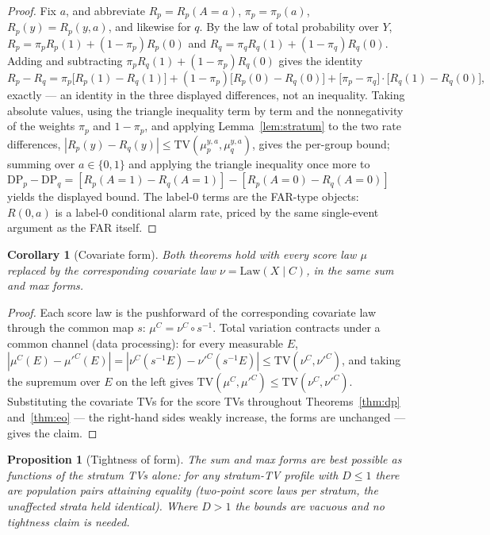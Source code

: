 \documentclass[11pt]{article}
\newtheorem{proposition}{Proposition}
\newtheorem{corollary}{Corollary}
\begin{document}
\begin{proof}
Fix $a$, and abbreviate $R_p = R_p(A{=}a)$, $\pi_p = \pi_p(a)$,
$R_p(y) = R_p(y,a)$, and likewise for $q$. By the law of total
probability over $Y$, $R_p = \pi_p R_p(1) + (1-\pi_p) R_p(0)$ and
$R_q = \pi_q R_q(1) + (1-\pi_q) R_q(0)$. Adding and subtracting
$\pi_p R_q(1) + (1-\pi_p) R_q(0)$ gives the identity
\[
R_p - R_q = \pi_p \bigl[R_p(1) - R_q(1)\bigr]
+ (1-\pi_p) \bigl[R_p(0) - R_q(0)\bigr]
+ \bigl[\pi_p - \pi_q\bigr] \cdot \bigl[R_q(1) - R_q(0)\bigr],
\]
exactly --- an identity in the three displayed differences, not an
inequality. Taking absolute values, using the triangle inequality
term by term and the nonnegativity of the weights $\pi_p$ and
$1-\pi_p$, and applying Lemma~\ref{lem:stratum} to the two rate
differences, $|R_p(y) - R_q(y)| \le
\mathrm{TV}(\mu_p^{y,a}, \mu_q^{y,a})$, gives the per-group bound;
summing over $a \in \{0,1\}$ and applying the triangle inequality
once more to $\mathrm{DP}_p - \mathrm{DP}_q = [R_p(A{=}1) -
R_q(A{=}1)] - [R_p(A{=}0) - R_q(A{=}0)]$ yields the displayed bound.
The label-0 terms are the FAR-type objects: $R(0,a)$ is a label-0
conditional alarm rate, priced by the same single-event argument
as the FAR itself.
\end{proof}

\begin{corollary}[Covariate form]
Both theorems hold with every score law $\mu$ replaced by the corresponding covariate law $\nu = \mathrm{Law}(X \mid C)$, in the same sum and max forms.
\end{corollary}

\begin{proof}
Each score law is the pushforward of the corresponding covariate
law through the common map $s$: $\mu^C = \nu^C \circ s^{-1}$.
Total variation contracts under a common channel (data
processing): for every measurable $E$,
$|\mu^C(E) - \mu'^C(E)| = |\nu^C(s^{-1}E) - \nu'^C(s^{-1}E)|
\le \mathrm{TV}(\nu^C, \nu'^C)$, and taking the supremum over
$E$ on the left gives $\mathrm{TV}(\mu^C, \mu'^C) \le
\mathrm{TV}(\nu^C, \nu'^C)$. Substituting the covariate TVs for
the score TVs throughout Theorems~\ref{thm:dp} and~\ref{thm:eo}
--- the right-hand sides weakly increase, the forms are unchanged
--- gives the claim.
\end{proof}

\begin{proposition}[Tightness of form]
The sum and max forms are best possible as functions of the stratum
TVs alone: for any stratum-TV profile with $D \le 1$ there are
population pairs attaining equality (two-point score laws per
stratum, the unaffected strata held identical). Where $D > 1$ the bounds are vacuous and no tightness claim is needed.
\end{proposition}
\end{document}
